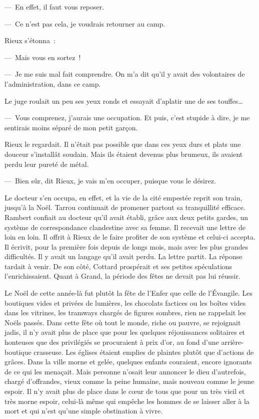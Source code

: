 \documentclass[french,twoside]{book} %
\begin{document}
— En effet, il faut vous reposer.\par
— Ce n’est pas cela, je voudrais retourner au camp.\par
Rieux s’étonna :\par
— Mais vous en sortez !\par
— Je me suis mal fait comprendre. On m’a dit qu’il y avait des volontaires de l’administration, dans ce camp.\par
Le juge roulait un peu ses yeux ronds et essayait d’aplatir une de ses touffes…\par
— Vous comprenez, j’aurais une occupation. Et puis, c’est stupide à dire, je me sentirais moins séparé de mon petit garçon.\par
Rieux le regardait. Il n’était pas possible que dans ces yeux durs et plats une douceur s’installât soudain. Mais ils étaient devenus plus brumeux, ils avaient perdu leur pureté de métal.\par
— Bien sûr, dit Rieux, je vais m’en occuper, puisque vous le désirez.\par
Le docteur s’en occupa, en effet, et la vie de la cité empestée reprit son train, jusqu’à la Noël. Tarrou continuait de promener partout sa tranquillité efficace. Rambert confiait au docteur qu’il avait établi, grâce aux deux petits gardes, un système de correspondance clandestine avec sa femme. Il recevait une lettre de loin en loin. Il offrit à Rieux de le faire profiter de son système et celui-ci accepta. Il écrivit, pour la première fois depuis de longs mois, mais avec les plus grandes difficultés. Il y avait un langage qu’il avait perdu. La lettre partit. La réponse tardait à venir. De son côté, Cottard prospérait et ses petites spéculations l’enrichissaient. Quant à Grand, la période des fêtes ne devait pas lui réussir.\par
Le Noël de cette année-là fut plutôt la fête de l’Enfer que celle de l’Évangile. Les boutiques vides et privées de lumières, les chocolats factices ou les boîtes vides dans les vitrines, les tramways chargés de figures sombres, rien ne rappelait les Noëls passés. Dans cette fête où tout le monde, riche ou pauvre, se rejoignait jadis, il n’y avait plus de place que pour les quelques réjouissances solitaires et honteuses que des privilégiés se procuraient à prix d’or, au fond d’une arrière-boutique crasseuse. Les églises étaient emplies de plaintes plutôt que d’actions de grâces. Dans la ville morne et gelée, quelques enfants couraient, encore ignorants de ce qui les menaçait. Mais personne n’osait leur annoncer le dieu d’autrefois, chargé d’offrandes, vieux comme la peine humaine, mais nouveau comme le jeune espoir. Il n’y avait plus de place dans le cœur de tous que pour un très vieil et très morne espoir, celui-là même qui empêche les hommes de se laisser aller à la mort et qui n’est qu’une simple obstination à vivre.\par
\end{document}
